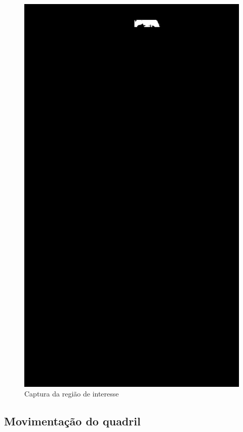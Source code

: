 \begin{figure}[!htb]
	\centering
	\includegraphics[scale=0.13]{figuras/ultrapassar_barra/134_only_interesse.png}
	\caption{Captura da região de interesse}
	\label{fig:ultrapassar_barra}
\end{figure}
\newpage



\subsection[Movimentação do quadril]{Movimentação do quadril}\label{sec:quadril}

